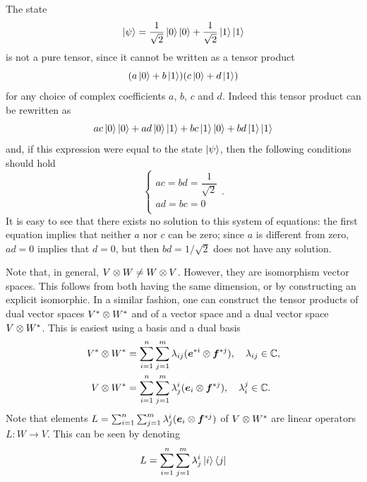 \begin{ex}
    The state 
    \begin{equation}
        \ket{\psi} = \frac{1}{\sqrt{2}}\ket{0}\ket{0} + \frac{1}{\sqrt{2}}\ket{1}\ket{1}
    \end{equation}
    is not a pure tensor, since it cannot be written as a tensor product 
    \begin{equation}
        (a\ket{0} + b\ket{1})(c\ket{0} + d\ket{1})
    \end{equation}
    for any choice of complex coefficients $a$, $b$, $c$ and $d$. Indeed this tensor product can be rewritten as
    \begin{equation}
        ac\ket{0}\ket{0} + ad\ket{0}\ket{1} + bc\ket{1}\ket{0} + bd\ket{1}\ket{1}
    \end{equation}
    and, if this expression were equal to the state $\ket{\psi}$, then the following conditions should hold
    \begin{equation}
        \begin{cases}
            ac = bd = \dfrac{1}{\sqrt{2}} \\[1.5ex]
            ad = bc = 0 \\
        \end{cases}.
    \end{equation}
    It is easy to see that there exists no solution to this system of equations: the first equation implies that neither $a$ nor $c$ can be zero; since $a$ is different from zero, $ad = 0$ implies that $d = 0$, but then $bd = 1/\sqrt{2}$ does not have any solution. 
\end{ex}
Note that, in general, $V \otimes W \neq W \otimes V$. However, they are isomorphism vector spaces. This follows from both having the same dimension, or by constructing an explicit isomorphic. In a similar fashion, one can construct the tensor products of dual vector spaces $V^* \otimes W^*$ and of a vector space and a dual vector space $V \otimes W^*$. This is easiest using a basis and a dual basis
\begin{align}
    V^* \otimes W^* &= \sum_{i=1}^n\sum_{j=1}^m\lambda_{ij}(\bm{e}^{*i} \otimes \bm{f}^{*j}),\quad \lambda_{ij} \in \mathbb{C}, \\
    V \otimes W^* &= \sum_{i=1}^n\sum_{j=1}^m\lambda_j^i(\bm{e}_i \otimes \bm{f}^{*j}),\quad \lambda_i^j \in \mathbb{C}.
\end{align}
Note that elements $L = \sum_{i=1}^n\sum_{j=1}^m\lambda_j^i(\bm{e}_i \otimes \bm{f}^{*j})$ of $V \otimes W^*$ are linear operators $L : W \to V$. This can be seen by denoting 
\begin{equation}
    L = \sum_{i=1}^n\sum_{j=1}^m\lambda_j^i\ket{i}\bra{j}
\end{equation}
